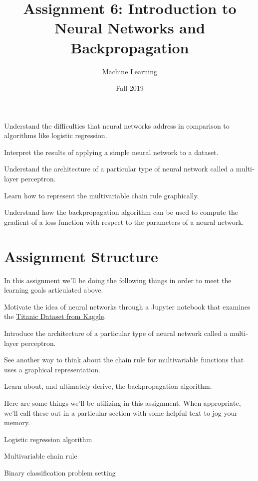 \documentclass[assignment06_Solutions]{subfiles}
\title{Assignment 6: Introduction to Neural Networks and Backpropagation}
\author{Machine Learning}
\date{Fall 2019}
\begin{document}
\maketitle
\thispagestyle{firstpage}


\begin{learningobjectives}
\bi
\item Understand the difficulties that neural networks address in comparison to algorithms like logistic regression.
\item Interpret the results of applying a simple neural network to a dataset.
\item Understand the architecture of a particular type of neural network called a multi-layer perceptron.
\item Learn how to represent the multivariable chain rule graphically.
\item Understand how the backpropagation algorithm can be used to compute the gradient of a loss function with respect to the parameters of a neural network.
\ei
\end{learningobjectives}


\section{Assignment Structure}
In this assignment we'll be doing the following things in order to meet the learning goals articulated above.
\be
\item Motivate the idea of neural networks through a Jupyter notebook that examines the \href{https://www.kaggle.com/c/titanic}{Titanic Dataset from Kaggle}.
\item Introduce the architecture of a particular type of neural network called a multi-layer perceptron.
\item See another way to think about the chain rule for multivariable functions that uses a graphical representation.
\item Learn about, and ultimately derive, the backpropagation algorithm.
\ee

\begin{priorknowledge}
Here are some things we'll be utilizing in this assignment.  When appropriate, we'll call these out in a particular section with some helpful text to jog your memory.
\bi
\item Logistic regression algorithm
\item Multivariable chain rule
\item Binary classification problem setting
\ei
\end{priorknowledge}
\end{document}

